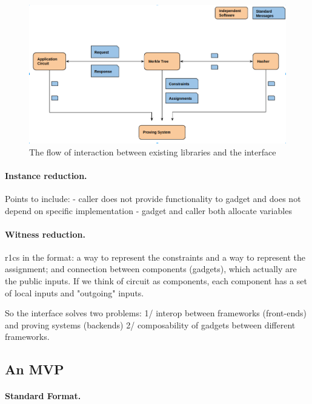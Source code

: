 			\begin{figure}[h!]
				\includegraphics[width=\linewidth]{routine.png}
				\caption{The flow of interaction between existing libraries and the interface}
				\label{flow}
			\end{figure}

		\paragraph{Instance reduction.} 
		
        Points to include:
        - caller does not provide functionality to gadget and does not depend on specific implementation
        - gadget and caller both allocate variables
		
		\paragraph{Witness reduction.}
		
		r1cs in the format: a way to represent the constraints and a way to represent the assignment; and connection between components (gadgets), which actually are the public inputs. If we think of circuit as components, each component has a set of local inputs and "outgoing" inputs.
		
		So the interface solves two problems: 1/ interop between frameworks (front-ends) and proving systems (backends) 2/ composability of gadgets between different frameworks.
		
	
		
		\subsection{An MVP}
		
        \paragraph{Standard Format.}

